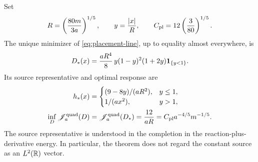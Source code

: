\begin{theorem}\label{thm:quadratic-placement}
Set
\begin{equation}\label{eq:placement-radius}
 R=\left(\frac{80m}{3a}\right)^{1/5},\qquad
 y=\frac{|x|}{R},\qquad C_{\rm pl}=12\left(\frac3{80}\right)^{1/5}.
\end{equation}
The unique minimizer of \eqref{eq:placement-line}, up to equality almost
everywhere, is
\begin{equation}\label{eq:placement-profile}
 D_*(x)=\frac{aR^4}{8}\,y(1-y)^2(1+2y)\mathbf 1_{\{y<1\}}.
\end{equation}
Its source representative and optimal response are
\begin{align}
 h_*(x)&=
 \begin{cases}
 (9-8y)/(aR^2),&y\le1,\\
 1/(ax^2),&y>1,
 \end{cases}\label{eq:placement-field}\\
 \inf_D\mathscr J_a^{\rm quad}(D)
 &=\mathscr J_a^{\rm quad}(D_*)
 =\frac{12}{aR}=C_{\rm pl}a^{-4/5}m^{-1/5}.
 \label{eq:placement-value}
\end{align}
The source representative is understood in the completion in the
reaction-plus-derivative energy. In particular, the theorem does not
regard the constant source as an $L^2(\mathbb R)$ vector.
\end{theorem}
